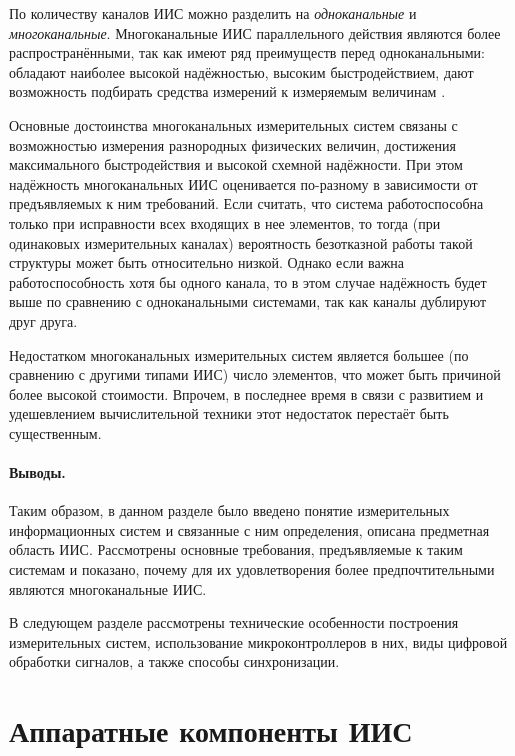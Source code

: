 \documentclass[a4paper, 14pt, titlepage]{extarticle}
\newcommand{\term}[1]{\emph{#1}}
\let\oldsection\section
\renewcommand{\section}{\newpage\oldsection}
\let\oldparagraph\paragraph
\renewcommand{\paragraph}[1]{\oldparagraph{\indent #1}}
\begin{document}
  По количеству каналов ИИС можно разделить на \term{одноканальные} и \term{многоканальные}. Многоканальные ИИС
  параллельного действия являются более распространёнными, так как имеют ряд преимуществ перед
  одноканальными: обладают наиболее высокой надёжностью, высоким быстродействием, дают возможность
  подбирать средства измерений к измеряемым величинам
  \cite[с.~171]{rannev-iis}.

  Основные достоинства многоканальных измерительных систем связаны с возможностью измерения
  разнородных физических величин, достижения
  максимального быстродействия и высокой схемной надёжности. При этом надёжность многоканальных ИИС
  оценивается по-разному в зависимости от предъявляемых к ним требований. Если считать, что система
  работоспособна только при исправности всех входящих в нее элементов, то тогда (при одинаковых
  измерительных каналах) вероятность безотказной работы такой структуры может быть относительно
  низкой. Однако если важна работоспособность хотя бы одного канала, то в этом случае надёжность
  будет выше по сравнению с одноканальными системами, так как каналы дублируют друг друга.

  Недостатком многоканальных измерительных систем является большее (по сравнению с
  другими типами ИИС) число элементов, что может быть причиной более высокой стоимости. Впрочем, в
  последнее время в связи с развитием и удешевлением вычислительной техники этот недостаток
  перестаёт быть существенным. %



  \paragraph{Выводы.}
  Таким образом, в данном разделе было введено понятие измерительных информационных
  систем и связанные с ним определения, описана предметная область ИИС. Рассмотрены
  основные требования, предъявляемые к таким системам и показано, почему для их удовлетворения более
  предпочтительными являются многоканальные ИИС.

  В следующем разделе рассмотрены технические особенности построения измерительных систем,
  использование микроконтроллеров в них, виды цифровой обработки сигналов, а также способы
  синхронизации.

  \section{Аппаратные компоненты ИИС}\label{sec:hardware}
\end{document}
